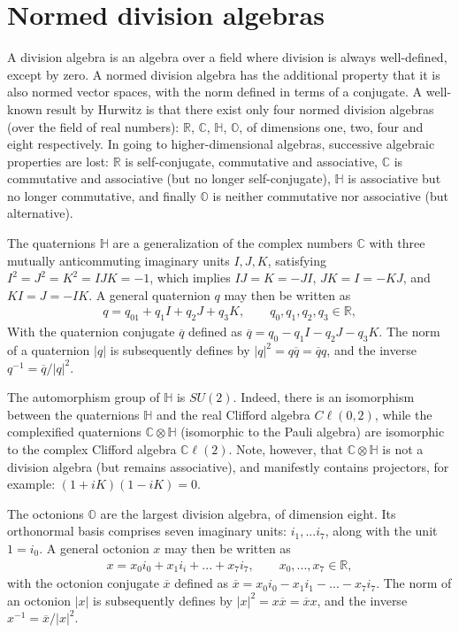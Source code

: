 \documentclass{article}
\newcommand{\bb}[1]{\mathbb{#1}}
\newcommand{\Cl}{C\ell}
\newcommand{\CCl}{\mathbb{C}\ell}
\begin{document}
\section{Normed division algebras}\label{sec:normeddivisionalgebras}

A division algebra is an algebra over a field where division is always well-defined, except by zero. A normed division algebra has the additional property that it is also normed vector spaces, with the norm defined in terms of a conjugate. A well-known result by Hurwitz \cite{hurwitz1898ueber} is that there exist only four normed division algebras (over the field of real numbers): $\bb{R}$, $\bb{C}$, $\bb{H}$, $\bb{O}$, of dimensions one, two, four and eight respectively. In going to higher-dimensional algebras, successive algebraic properties are lost: $\bb{R}$ is self-conjugate, commutative and associative, $\bb{C}$ is commutative and associative (but no longer self-conjugate), $\bb{H}$ is associative but no longer commutative, and finally $\bb{O}$ is neither commutative nor associative (but alternative).

The quaternions $\bb{H}$ are a generalization of the complex numbers $\bb{C}$ with three mutually anticommuting imaginary units $I,J,K$, satisfying $I^2=J^2=K^2=IJK=-1$, which implies $IJ=K=-JI$, $JK=I=-KJ$, and $KI=J=-IK$. A general quaternion $q$ may then be written as
\begin{eqnarray}
    q=q_01+q_1I+q_2J+q_3K,\qquad q_0,q_1,q_2,q_3\in\bb{R},
\end{eqnarray}
With the quaternion conjugate $\overline{q}$ defined as $\overline{q}=q_0-q_1I-q_2J-q_3K$. The norm of a quaternion $\vert q\vert$ is subsequently defines by $\vert q\vert^2=q\overline{q}=\overline{q}q$, and the inverse $q^{-1}=\overline{q}/\vert q\vert^2$. 

The automorphism group of $\bb{H}$ is $SU(2)$. Indeed, there is an isomorphism between the quaternions $\bb{H}$ and the real Clifford algebra $\Cl(0,2)$, while the complexified quaternions $\bb{C}\otimes\bb{H}$ (isomorphic to the Pauli algebra) are isomorphic to the complex Clifford algebra $\CCl(2)$. Note, however, that $\bb{C}\otimes\bb{H}$ is not a division algebra (but remains associative), and manifestly contains projectors, for example: $(1+iK)(1-iK)=0$.



The octonions $\bb{O}$ are the largest division algebra, of dimension eight. Its orthonormal basis comprises seven imaginary units: $i_1,...i_7$, along with the unit $1=i_0$. A general octonion $x$ may then be written as
\begin{eqnarray}
    x=x_0i_0+x_1i_i+...+x_7i_7,\qquad x_0,...,x_7\in\bb{R},
\end{eqnarray}
with the octonion conjugate $\overline{x}$ defined as $\overline{x}=x_0i_0-x_1i_1-...-x_7i_7$. The norm of an octonion $\vert x\vert$ is subsequently defines by $\vert x\vert^2=x\overline{x}=\overline{x}x$, and the inverse $x^{-1}=\overline{x}/\vert x\vert^2$. 
\end{document}
